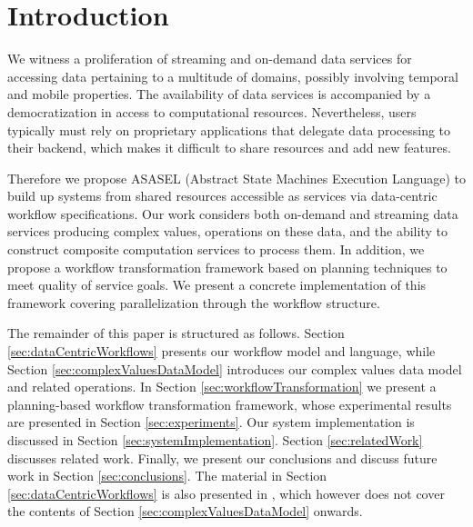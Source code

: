 	
\section{Introduction}\label{sec:asasel:intro}


We witness a proliferation of streaming and on-demand data services for accessing data pertaining to a multitude of domains, possibly involving temporal and mobile properties. The availability of data services is accompanied by a democratization in access to computational resources. Nevertheless, users typically must rely on proprietary applications that delegate data processing to their backend, which makes it difficult to share resources and add new features.	
	
Therefore we propose ASASEL (Abstract State Machines Execution Language) to build up systems from shared resources accessible as services via data-centric workflow specifications. Our work considers both on-demand and streaming data services producing complex values, operations on these data, and the ability to construct composite computation services to process them. In addition, we propose a workflow transformation framework 
based on planning techniques to meet quality of service goals. We present a concrete implementation of this framework covering parallelization through the workflow structure.

The remainder of this paper is structured as follows. Section \ref{sec:dataCentricWorkflows} presents our workflow model and language, while Section \ref{sec:complexValuesDataModel} introduces our complex values data model and related operations. In Section \ref{sec:workflowTransformation} we present a planning-based workflow transformation framework, whose experimental results are presented in Section \ref{sec:experiments}. Our system implementation is discussed in Section \ref{sec:systemImplementation}. Section \ref{sec:relatedWork} discusses related work. Finally, we present our conclusions and discuss future work in Section \ref{sec:conclusions}. The material in Section \ref{sec:dataCentricWorkflows} is also presented in \cite{Cuevas-Vicenttin:2010:CSA:1947725.1947753}, which however does not cover the contents of Section \ref{sec:complexValuesDataModel} onwards.

 


